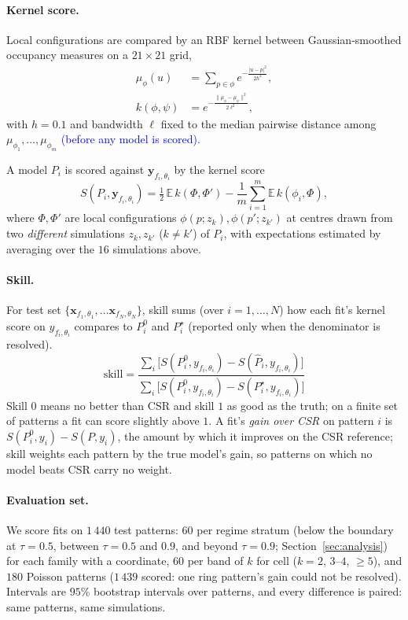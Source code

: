 \documentclass[twoside]{article}
\newcommand{\review}[1]{\textcolor{blue}{#1}}
\newcommand{\pc}{\mathbf{x}}
\newcommand{\rc}{\mathbf{y}}
\begin{document}
\paragraph{Kernel score.}
Local configurations are compared by an RBF kernel between Gaussian-smoothed occupancy measures on a $21\times21$ grid,
\begin{align}
    \mu_\phi(u) &= \sum_{p\in\phi}e^{-\frac{|u-p|^2}{2h^2}},\\
    k(\phi,\psi) &= e^{-\frac{\|\mu_\phi-\mu_\psi\|^2}{2\ell^2}},
\end{align}
with $h=0.1$ and bandwidth $\ell$ fixed to the median pairwise distance among $\mu_{\phi_1},\dots,\mu_{\phi_m}$ \review{(before any model is scored).}

A model $P_i$ is scored against $\rc_{f_i, \theta_i}$ by the kernel score
\begin{equation}
  S(P_i,\rc_{f_i, \theta_i})=\tfrac12\,\mathbb{E}\,k(\Phi,\Phi')-\frac1m\sum_{i=1}^{m}\mathbb{E}\,k(\phi_i,\Phi),
  \label{eq:kernel}
\end{equation}
where $\Phi,\Phi'$ are local configurations $\phi(p;z_k),\phi(p';z_{k'})$ at centres drawn from two \emph{different} simulations $z_k,z_{k'}$ ($k\ne k'$) of $P_i$, with expectations estimated by averaging over the $16$ simulations above.

\paragraph{Skill.}
For test set $\{\pc_{f_1, \theta_1}, \dots \pc_{f_N, \theta_N}\}$, skill sums (over $i=1,\dots,N$) how each fit's kernel score on $y_{f_i, \theta_i}$ compares to $P^0_i$ and $P^\star_i$ (reported only when the denominator is resolved).
\begin{equation}
  \mathrm{skill}=\frac{\sum_i\big[S(P^0_i,y_{f_i, \theta_i})-S(\hat P_i,y_{f_i, \theta_i})\big]}{\sum_i\big[S(P^0_i,y_{f_i, \theta_i})-S(P^\star_i,y_{f_i, \theta_i})\big]}
  \label{eq:skill}
\end{equation}
Skill $0$ means no better than CSR and skill $1$ as good as the truth; on a finite set of patterns a fit can score
slightly above $1$. A fit's \emph{gain over CSR} on pattern $i$ is $S(P^0_i,y_i)-S(P,y_i)$, the amount by which it
improves on the CSR reference; skill weights each pattern by the true model's gain, so patterns on which no model
beats CSR carry no weight.

\paragraph{Evaluation set.}
We score fits on $1\,440$ test patterns: $60$ per regime stratum (below the boundary at $\tau=0.5$, between $\tau=0.5$
and $0.9$, and beyond $\tau=0.9$; Section~\ref{sec:analysis}) for each family with a coordinate, $60$ per band of $k$
for cell ($k=2$, $3$--$4$, $\ge5$), and $180$ Poisson patterns ($1\,439$ scored: one ring pattern's gain could not be
resolved). Intervals are $95\%$ bootstrap intervals over patterns, and every difference is paired: same patterns, same
simulations.
\end{document}
